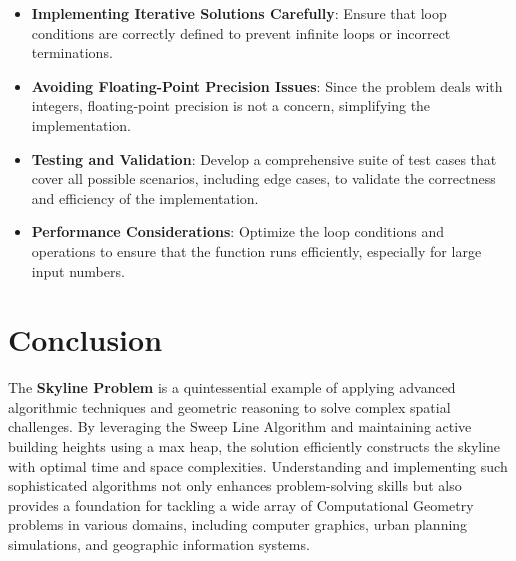 \begin{itemize}
    \item \textbf{Implementing Iterative Solutions Carefully}: Ensure that loop conditions are correctly defined to prevent infinite loops or incorrect terminations.
    
    \item \textbf{Avoiding Floating-Point Precision Issues}: Since the problem deals with integers, floating-point precision is not a concern, simplifying the implementation.
    
    \item \textbf{Testing and Validation}: Develop a comprehensive suite of test cases that cover all possible scenarios, including edge cases, to validate the correctness and efficiency of the implementation.
    
    \item \textbf{Performance Considerations}: Optimize the loop conditions and operations to ensure that the function runs efficiently, especially for large input numbers.
\end{itemize}

\section*{Conclusion}

The \textbf{Skyline Problem} is a quintessential example of applying advanced algorithmic techniques and geometric reasoning to solve complex spatial challenges. By leveraging the Sweep Line Algorithm and maintaining active building heights using a max heap, the solution efficiently constructs the skyline with optimal time and space complexities. Understanding and implementing such sophisticated algorithms not only enhances problem-solving skills but also provides a foundation for tackling a wide array of Computational Geometry problems in various domains, including computer graphics, urban planning simulations, and geographic information systems.

\printindex

% 
% 
% 
% 
